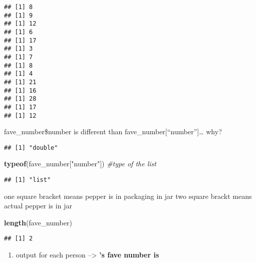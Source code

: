 \documentclass[
]{article}
\newenvironment{Shaded}{\begin{snugshade}}{\end{snugshade}}
\newcommand{\CommentTok}[1]{\textcolor[rgb]{0.56,0.35,0.01}{\textit{#1}}}
\newcommand{\ControlFlowTok}[1]{\textcolor[rgb]{0.13,0.29,0.53}{\textbf{#1}}}
\newcommand{\FunctionTok}[1]{\textcolor[rgb]{0.13,0.29,0.53}{\textbf{#1}}}
\newcommand{\NormalTok}[1]{#1}
\newcommand{\SpecialCharTok}[1]{\textcolor[rgb]{0.81,0.36,0.00}{\textbf{#1}}}
\newcommand{\StringTok}[1]{\textcolor[rgb]{0.31,0.60,0.02}{#1}}
\providecommand{\tightlist}{%
  \setlength{\itemsep}{0pt}\setlength{\parskip}{0pt}}
\begin{document}
\begin{verbatim}
## [1] 8
## [1] 9
## [1] 12
## [1] 6
## [1] 17
## [1] 3
## [1] 7
## [1] 8
## [1] 4
## [1] 21
## [1] 16
## [1] 28
## [1] 17
## [1] 12
\end{verbatim}

fave\_number\$number is different than
fave\_number{[}``number''{]}\ldots{} why?

\begin{Shaded}
\end{Shaded}

\begin{verbatim}
## [1] "double"
\end{verbatim}

\begin{Shaded}
\begin{Highlighting}[]
\FunctionTok{typeof}\NormalTok{(fave\_number[}\StringTok{"number"}\NormalTok{]) }\CommentTok{\#type of the list}
\end{Highlighting}
\end{Shaded}

\begin{verbatim}
## [1] "list"
\end{verbatim}

one square bracket means pepper is in packaging in jar two square brackt
means actual pepper is in jar

\begin{Shaded}
\begin{Highlighting}[]
\FunctionTok{length}\NormalTok{(fave\_number)}
\end{Highlighting}
\end{Shaded}

\begin{verbatim}
## [1] 2
\end{verbatim}

\begin{enumerate}
\def\labelenumi{\arabic{enumi}.}
\setcounter{enumi}{1}
\tightlist
\item
  output for each person --\textgreater{} \textbf{'s fave number is }
\end{enumerate}

\begin{Shaded}
\end{Shaded}
\end{document}
